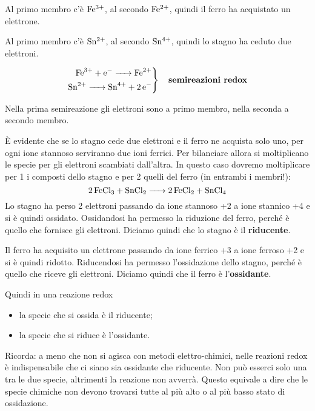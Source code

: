 Al primo membro c'è $\rm Fe^{3+}$, al secondo $\rm Fe^{2+}$, quindi il ferro ha acquistato un elettrone.

Al primo membro c'è $\rm Sn^{2+}$, al secondo $\rm Sn^{4+}$, quindi lo stagno ha ceduto due elettroni.

\begin{equation*}
  \left.\begin{aligned}
  \ce{Fe^{3+} + e^- -> Fe^{2+}}\\
  \ce{Sn^{2+} -> Sn^{4+} + 2 e^-}
\end{aligned}\right\} \quad \textbf{semireazioni redox}
\end{equation*}

Nella prima semireazione gli elettroni sono a primo membro, nella seconda a secondo membro.

È evidente che se lo stagno cede due elettroni e il ferro ne acquista solo uno, per ogni ione stannoso serviranno due ioni ferrici.
Per bilanciare allora si moltiplicano le specie per gli elettroni scambiati dall'altra.
In questo caso dovremo moltiplicare per 1 i composti dello stagno e per 2 quelli del ferro (in entrambi i membri!):
$$\ce{2 FeCl_3 + SnCl_2 -> 2 FeCl_2 + SnCl_4}$$
Lo stagno ha perso 2 elettroni passando da ione stannoso +2 a ione stannico +4 e si è quindi ossidato. Ossidandosi ha permesso la riduzione del ferro, perché è quello che fornisce gli elettroni. Diciamo quindi che lo stagno è il \textbf{riducente}.

Il ferro ha acquisito un elettrone passando da ione ferrico +3 a ione ferroso +2 e si è quindi ridotto. Riducendosi ha permesso l'ossidazione dello stagno, perché è quello che riceve gli elettroni. Diciamo quindi che il ferro è l'\textbf{ossidante}.

\vspace{0.2cm}Quindi in una reazione redox

\begin{itemize}[leftmargin=0.5cm]
  \item la specie che si ossida è il riducente;
  \item la specie che si riduce è l'ossidante.
\end{itemize}

Ricorda: a meno che non si agisca con metodi elettro-chimici, nelle reazioni redox è indispensabile che ci siano sia ossidante che riducente. Non può esserci solo una tra le due specie, altrimenti la reazione non avverrà. Questo equivale a dire che le specie chimiche non devono trovarsi tutte al più alto o al più basso stato di ossidazione.

